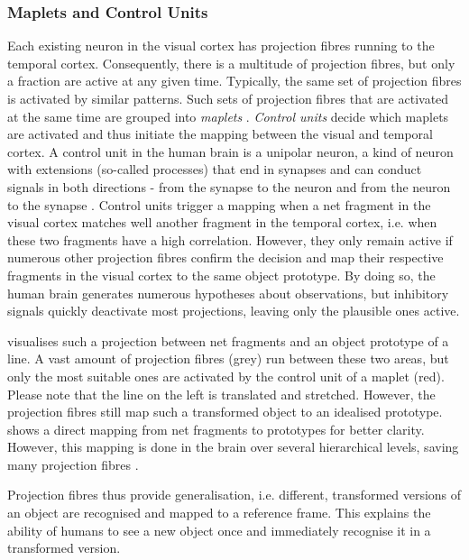 \subsubsection{Maplets and Control Units}
Each existing neuron in the visual cortex has projection fibres running to the temporal cortex. Consequently, there is a multitude of projection fibres, but only a fraction are active at any given time.
Typically, the same set of projection fibres is activated by similar patterns.
Such sets of projection fibres that are activated at the same time are grouped into \emph{maplets} .
\emph{Control units} decide which maplets are activated and thus initiate the mapping between the visual and temporal cortex. 
A control unit in the human brain is a unipolar neuron, a kind of neuron with extensions (so-called processes) that end in synapses and can conduct signals in both directions - from the synapse to the neuron and from the neuron to the synapse .
Control units trigger a mapping when a net fragment in the visual cortex matches well another fragment in the temporal cortex, i.e. when these two fragments have a high correlation. However, they only remain active if numerous other projection fibres confirm the decision and map their respective fragments in the visual cortex to the same object prototype. By doing so, the human brain generates numerous hypotheses about observations, but inhibitory signals quickly deactivate most projections, leaving only the plausible ones active.

 visualises such a projection between net fragments and an object prototype of a line. A vast amount of projection fibres (grey) run between these two areas, but only the most suitable ones are activated by the control unit of a maplet (red).
Please note that the line on the left is translated and stretched. However, the projection fibres still map such a transformed object to an idealised prototype.
 shows a direct mapping from net fragments to prototypes for better clarity. However, this mapping is done in the brain over several hierarchical levels, saving many projection fibres .

Projection fibres thus provide generalisation, i.e. different, transformed versions of an object are recognised and mapped to a reference frame. This explains the ability of humans to see a new object once and immediately recognise it in a transformed version.

